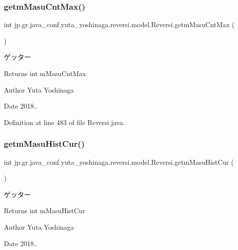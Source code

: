 \subsubsection{\texorpdfstring{getm\+Masu\+Cnt\+Max()}{getmMasuCntMax()}}
{\footnotesize\ttfamily int jp.\+gr.\+java\+\_\+conf.\+yuta\+\_\+yoshinaga.\+reversi.\+model.\+Reversi.\+getm\+Masu\+Cnt\+Max (\begin{DoxyParamCaption}{ }\end{DoxyParamCaption})}



ゲッター 

\begin{DoxyReturn}{Returns}
int m\+Masu\+Cnt\+Max 
\end{DoxyReturn}
\begin{DoxyAuthor}{Author}
Yuta Yoshinaga 
\end{DoxyAuthor}
\begin{DoxyDate}{Date}
2018.. 
\end{DoxyDate}


Definition at line 483 of file Reversi.\+java.

\mbox{\label{classjp_1_1gr_1_1java__conf_1_1yuta__yoshinaga_1_1reversi_1_1model_1_1_reversi_a0bc45b287c439f0fcce73779a91be405}} 
\subsubsection{\texorpdfstring{getm\+Masu\+Hist\+Cur()}{getmMasuHistCur()}}
{\footnotesize\ttfamily int jp.\+gr.\+java\+\_\+conf.\+yuta\+\_\+yoshinaga.\+reversi.\+model.\+Reversi.\+getm\+Masu\+Hist\+Cur (\begin{DoxyParamCaption}{ }\end{DoxyParamCaption})}



ゲッター 

\begin{DoxyReturn}{Returns}
int m\+Masu\+Hist\+Cur 
\end{DoxyReturn}
\begin{DoxyAuthor}{Author}
Yuta Yoshinaga 
\end{DoxyAuthor}
\begin{DoxyDate}{Date}
2018.. 
\end{DoxyDate}


